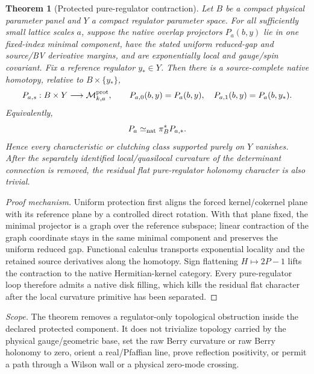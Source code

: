 \documentclass[11pt,a4paper,oneside]{book}
\theoremstyle{plain}
\newtheorem{theorem}{Theorem}[chapter]
\theoremstyle{definition}
\theoremstyle{remark}
\newcommand{\src}[2]{\cite{#1}}
\newcommand{\scope}[1]{\par\smallskip\noindent\textit{Scope.} #1\par\smallskip}
\begin{document}
\begin{theorem}[Protected pure-regulator contraction]
\label{thm:pure-regulator-contraction}
Let $B$ be a compact physical parameter panel and $Y$ a compact regulator
parameter space.  For all sufficiently small lattice scales $a$, suppose the
native overlap projectors $P_a(b,y)$ lie in one fixed-index minimal component,
have the stated uniform reduced-gap and source/BV derivative margins, and are
exponentially local and gauge/spin covariant.  Fix a reference regulator
$y_*\in Y$.  Then there is a source-complete native homotopy, relative to
$B\times\{y_*\}$,
\begin{equation}
 P_{a,s}:B\times Y\longrightarrow\mathcal M_{k,a}^{\rm prot},
 \qquad
 P_{a,0}(b,y)=P_a(b,y),\quad
 P_{a,1}(b,y)=P_a(b,y_*).
 \label{eq:pure-regulator-contraction}
\end{equation}
Equivalently,
\begin{equation}
 P_a\simeq_{\rm nat}\pi_B^*P_{a,*}.
 \label{eq:pure-regulator-pullback}
\end{equation}
Hence every characteristic or clutching class supported purely on $Y$ vanishes.
After the separately identified local/quasilocal curvature of the determinant
connection is removed, the residual flat pure-regulator holonomy character is
also trivial.
\end{theorem}
\begin{proof}[Proof mechanism]
Uniform protection first aligns the forced kernel/cokernel plane with its
reference plane by a controlled direct rotation.  With that plane fixed, the
minimal projector is a graph over the reference subspace; linear contraction
of the graph coordinate stays in the same minimal component and preserves the
uniform reduced gap.  Functional calculus transports exponential locality and
the retained source derivatives along the homotopy.  Sign flattening
$H\mapsto2P-1$ lifts the contraction to the native Hermitian-kernel category.
Every pure-regulator loop therefore admits a native disk filling, which kills
the residual flat character after the local curvature primitive has been
separated.
\end{proof}
\src{PG44}{thm:v42-full-contraction,cor:v42-no-higher-projector,thm:v42-flat-trivial}

\scope{The theorem removes a regulator-only topological obstruction inside the
declared protected component.  It does not trivialize topology carried by the
physical gauge/geometric base, set the raw Berry curvature or raw Berry
holonomy to zero, orient a real/Pfaffian line, prove reflection positivity, or
permit a path through a Wilson wall or a physical zero-mode crossing.}
\end{document}
